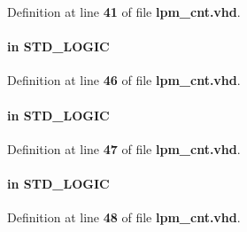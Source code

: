 Definition at line {\bf 41} of file {\bf lpm\+\_\+cnt.\+vhd}.

\paragraph[{aclr}]{ {\bfseries \textcolor{keywordflow}{in}\textcolor{vhdlchar}{ }} {\bfseries \textcolor{comment}{S\+T\+D\+\_\+\+L\+O\+G\+IC}\textcolor{vhdlchar}{ }} \hspace{0.3cm}{\ttfamily [Port]}}\label{classlpm__cnt_a8bc90b7127d506c19a0fd39262a96581}


Definition at line {\bf 46} of file {\bf lpm\+\_\+cnt.\+vhd}.

\paragraph[{clock}]{ {\bfseries \textcolor{keywordflow}{in}\textcolor{vhdlchar}{ }} {\bfseries \textcolor{comment}{S\+T\+D\+\_\+\+L\+O\+G\+IC}\textcolor{vhdlchar}{ }} \hspace{0.3cm}{\ttfamily [Port]}}\label{classlpm__cnt_a94e37f4a694983c46ed8002169815d5c}


Definition at line {\bf 47} of file {\bf lpm\+\_\+cnt.\+vhd}.

\paragraph[{cnt\+\_\+en}]{ {\bfseries \textcolor{keywordflow}{in}\textcolor{vhdlchar}{ }} {\bfseries \textcolor{comment}{S\+T\+D\+\_\+\+L\+O\+G\+IC}\textcolor{vhdlchar}{ }} \hspace{0.3cm}{\ttfamily [Port]}}\label{classlpm__cnt_a5db05fa614d6c97cfb0820b41c09a49a}


Definition at line {\bf 48} of file {\bf lpm\+\_\+cnt.\+vhd}.

\paragraph[{ieee}]{\hspace{0.3cm}{\ttfamily [Library]}}\label{classlpm__cnt_a0a6af6eef40212dbaf130d57ce711256}


